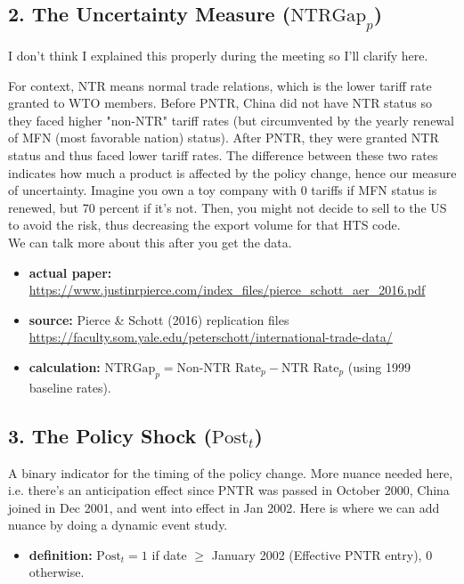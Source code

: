 \documentclass[12pt]{article}
\begin{document}
\subsection*{2. The Uncertainty Measure ($\text{NTRGap}_p$)}
I don't think I explained this properly during the meeting so I'll clarify here.

For context, NTR means normal trade relations, which is the lower tariff rate granted to WTO members. Before PNTR, China did not have NTR status so they faced higher "non-NTR" tariff rates (but circumvented by the yearly renewal of MFN (most favorable nation) status). After PNTR, they were granted NTR status and thus faced lower tariff rates. The difference between these two rates indicates how much a product is affected by the policy change, hence our measure of uncertainty. Imagine you own a toy company with 0 tariffs if MFN status is renewed, but 70 percent if it's not. Then, you might not decide to sell to the US to avoid the risk, thus decreasing the export volume for that HTS code. \\

We can talk more about this after you get the data.

\begin{itemize}
    \item \textbf{actual paper:} \url{https://www.justinrpierce.com/index_files/pierce_schott_aer_2016.pdf}
    \item \textbf{source:} Pierce \& Schott (2016) replication files \url{https://faculty.som.yale.edu/peterschott/international-trade-data/}
    \item \textbf{calculation:} $\text{NTRGap}_p = \text{Non-NTR Rate}_p - \text{NTR Rate}_p$ (using 1999 baseline rates).
\end{itemize}

\subsection*{3. The Policy Shock ($\text{Post}_t$)}
A binary indicator for the timing of the policy change. More nuance needed here, i.e. there's an anticipation effect since PNTR was passed in October 2000, China joined in Dec 2001, and went into effect in Jan 2002. Here is where we can add nuance by doing a dynamic event study.
\begin{itemize}
    \item \textbf{definition:} $\text{Post}_t = 1$ if date $\ge$ January 2002 (Effective PNTR entry), $0$ otherwise.
\end{itemize}
\end{document}

